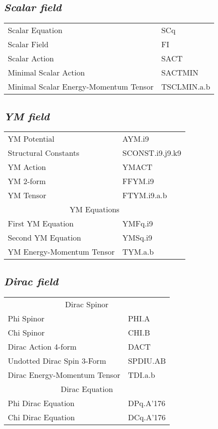 \documentclass[twocolumn]{article}
\newcommand{\grgtt}{\ttfamily}
\renewcommand{\tt}{\grgtt}
\newcommand{\cc}{{\tt \char'176}}           %
\begin{document}
\subsection{\sf\slshape  Scalar field}
\begin{tabular}{|l|l|}\hline
\tt    Scalar Equation       &\tt  SCq\\
\tt    Scalar Field          &\tt  FI\\
\tt    Scalar Action         &\tt  SACT\\
\tt    Minimal Scalar Action &\tt  SACTMIN\\
\tt    Minimal Scalar Energy-Momentum Tensor &\tt  TSCLMIN.a.b\\
\hline\end{tabular}


\subsection{\sf\slshape YM field}
\begin{tabular}{|l|l|}\hline
\tt    YM Potential         &\tt  AYM.i9\\
\tt    Structural Constants &\tt  SCONST.i9.j9.k9\\
\tt    YM Action            &\tt  YMACT\\
\tt    YM 2-form          &\tt  FFYM.i9\\
\tt    YM Tensor          &\tt   FTYM.i9.a.b\\
\hline
\multicolumn{2}{|c|}{\tt    YM Equations}\\
\tt    First YM Equation  &\tt   YMFq.i9\\
\tt    Second YM Equation &\tt   YMSq.i9\\
\hline
\tt    YM Energy-Momentum Tensor &\tt  TYM.a.b\\
\hline\end{tabular}

\subsection{\sf\slshape  Dirac field}
\begin{tabular}{|l|l|}\hline
\multicolumn{2}{|c|}{\tt    Dirac Spinor}\\
\tt    Phi Spinor   &\tt   PHI.A\\
\tt    Chi Spinor   &\tt   CHI.B\\
\hline
\tt    Dirac Action 4-form &\tt  DACT\\
\tt    Undotted Dirac Spin 3-Form &\tt  SPDIU.AB\\
\tt    Dirac Energy-Momentum Tensor &\tt  TDI.a.b\\
\hline
\multicolumn{2}{|c|}{\tt    Dirac Equation}\\
\tt    Phi Dirac Equation  &\tt   DPq.A\cc\\
\tt    Chi Dirac Equation  &\tt   DCq.A\cc\\
\hline\end{tabular}
\end{document}
